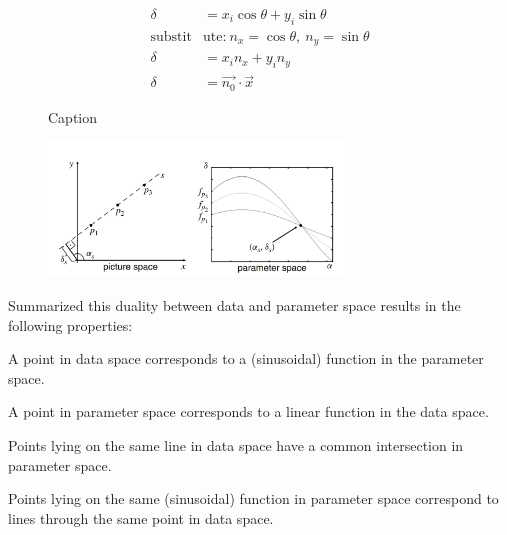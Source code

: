 \begin{align}
    \delta &= x_i \cos{\theta} + y_i \sin{\theta}\nonumber\\
    \text{substit}&\text{ute:}\ n_x = \cos{\theta},\ n_y = \sin{\theta} \nonumber\\
    \delta &= x_i n_x + y_i n_y\nonumber\\
    \label{eq:hnfunv}
    \delta &= \vec{n_0}\cdot\vec{x} 
\end{align}

\begin{figure}
    \centering
    \caption{Caption}
    \label{fig:my_label}
\end{figure}

\begin{figure}
    \centering
    \includegraphics[width=0.7\textwidth]{figures/TODOHOUGHTHETADIST.png}
    \caption{\cite{CASHachtert2008global}}
    \label{fig:TODOHOUGH}
\end{figure}

Summarized this duality between data and parameter space results in the following properties:\label{ssec:properties}
\begin{property}\label{prop:hough1}
A point in data space corresponds to a (sinusoidal) function in the parameter space. 
\end{property}
\begin{property}\label{prop:hough2}
A point in parameter space corresponds to a linear function in the data space.
\end{property}
\begin{property}\label{prop:hough3}
Points lying on the same line in data space have a common intersection in parameter space.
\end{property}
\begin{property}\label{prop:hough4}
Points lying on the same (sinusoidal) function in parameter space correspond to lines through the same point in data space.
\end{property}

